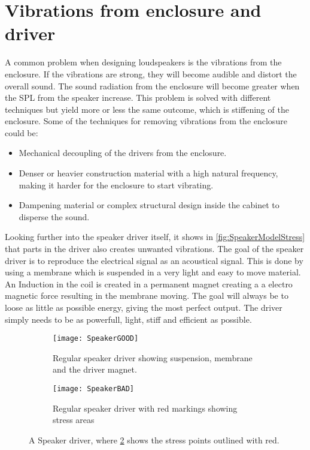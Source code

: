 \section{Vibrations from enclosure and driver}

A common problem when designing loudspeakers is the vibrations from the enclosure. If the vibrations are strong, they will become audible and distort the overall sound. The sound radiation from the enclosure will become greater when the \gls{SPL} from the speaker increase. This problem is solved with different techniques but yield more or less the same outcome, which is stiffening of the enclosure. Some of the techniques for removing vibrations from the enclosure could be:
\begin{itemize}
\item Mechanical decoupling of the drivers from the enclosure.
\item Denser or heavier construction material with a high natural frequency, making it harder for the enclosure to start vibrating.
\item Dampening material or complex structural design inside the cabinet to disperse the sound.
\end{itemize}

Looking further into the speaker driver itself, it shows in \autoref{fig:SpeakerModelStress} that parts in the driver also creates unwanted vibrations. The goal of the speaker driver is to reproduce the electrical signal as an acoustical signal. This is done by using a membrane which is suspended in a very light and easy to move material. An Induction in the coil is created in a permanent magnet creating a a electro magnetic force resulting in the membrane moving. The goal will always be to loose as little as possible energy, giving the most perfect output. The driver simply needs to be as powerfull, light, stiff and efficient as possible.

\begin{figure}[H]
\centering
\begin{subfigure}[t]{0.47\textwidth}
\texttt{[image: SpeakerGOOD]}
	\caption{Regular speaker driver showing suspension, membrane and the driver magnet.}
	\label{fig:regularspeaker}
\end{subfigure}
\hspace{6mm} 
\begin{subfigure}[t]{0.47\textwidth}
\texttt{[image: SpeakerBAD]}
	\caption{Regular speaker driver with red markings showing stress areas}
	\label{fig:badspeaker}
\end{subfigure}
\caption{A Speaker driver, where \ref{fig:badspeaker} shows the stress points outlined with red.}
\label{fig:SpeakerModelStress}
\end{figure}

